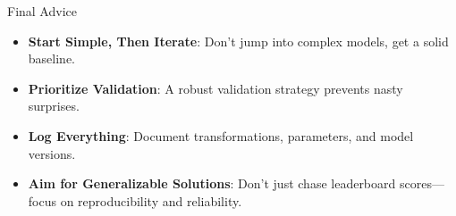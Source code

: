 \documentclass[ignorenonframetext,]{beamer}
\begin{document}
\begin{frame}{Final Advice}
\begin{itemize}
  \item \textbf{Start Simple, Then Iterate}: Don’t jump into complex models, get a solid baseline.
  \item \textbf{Prioritize Validation}: A robust validation strategy prevents nasty surprises.
  \item \textbf{Log Everything}: Document transformations, parameters, and model versions.
  \item \textbf{Aim for Generalizable Solutions}: Don’t just chase leaderboard scores—focus on reproducibility and reliability.
\end{itemize}
\end{frame}
\end{document}
